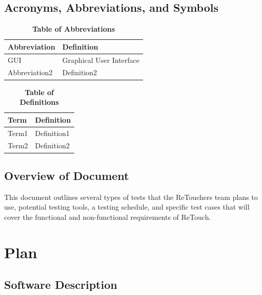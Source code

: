 \documentclass[12pt, titlepage]{article}
\begin{document}
\subsection{Acronyms, Abbreviations, and Symbols}
	
\begin{table}[hbp]
\caption{\textbf{Table of Abbreviations}} \label{Table}

\begin{tabularx}{\textwidth}{p{3cm}X}
\toprule
\textbf{Abbreviation} & \textbf{Definition} \\
\midrule
GUI & Graphical User Interface\\
Abbreviation2 & Definition2\\
\bottomrule
\end{tabularx}

\end{table}

\begin{table}[!htbp]
\caption{\textbf{Table of Definitions}} \label{Table}

\begin{tabularx}{\textwidth}{p{3cm}X}
\toprule
\textbf{Term} & \textbf{Definition}\\
\midrule
Term1 & Definition1\\
Term2 & Definition2\\
\bottomrule
\end{tabularx}

\end{table}	

\subsection{Overview of Document}

	This document outlines several types of tests that the ReTouchers team plans to use, potential testing tools, a testing schedule, and specific test cases that will cover the functional and non-functional requirements of ReTouch. 

\section{Plan}
	
\subsection{Software Description}
\end{document}
